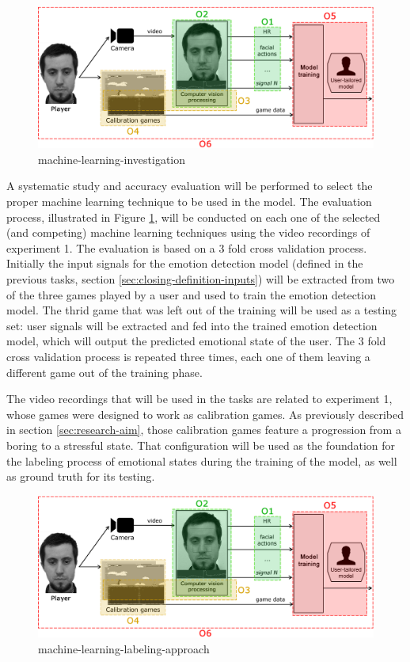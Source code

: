 \begin{figure}[h]
    \centering
    \includegraphics[width=\textwidth]{figures/components-objectives.png}
    \caption{machine-learning-investigation}
    \label{fig:machine-learning-investigation}
\end{figure}

A systematic study and accuracy evaluation will be performed to select the proper machine learning technique to be used in the model. The evaluation process, illustrated in Figure \ref{fig:machine-learning-investigation}, will be conducted on each one of the selected (and competing) machine learning techniques using the video recordings of experiment 1. The evaluation is based on a 3 fold cross validation process. Initially the input signals for the emotion detection model (defined in the previous tasks, section \ref{sec:closing-definition-inputs}) will be extracted from two of the three games played by a user and used to train the emotion detection model. The thrid game that was left out of the training will be used as a testing set: user signals will be extracted and fed into the trained emotion detection model, which will output the predicted emotional state of the user. The 3 fold cross validation process is repeated three times, each one of them leaving a different game out of the training phase.

The video recordings that will be used in the tasks are related to experiment 1, whose games were designed to work as calibration games. As previously described in section \ref{sec:research-aim}, those calibration games feature a progression from a boring to a stressful state. That configuration will be used as the foundation for the labeling process of emotional states during the training of the model, as well as ground truth for its testing.

\begin{figure}[h]
    \centering
    \includegraphics[width=\textwidth]{figures/components-objectives.png}
    \caption{machine-learning-labeling-approach}
    \label{fig:machine-learning-labeling-approach}
\end{figure}

